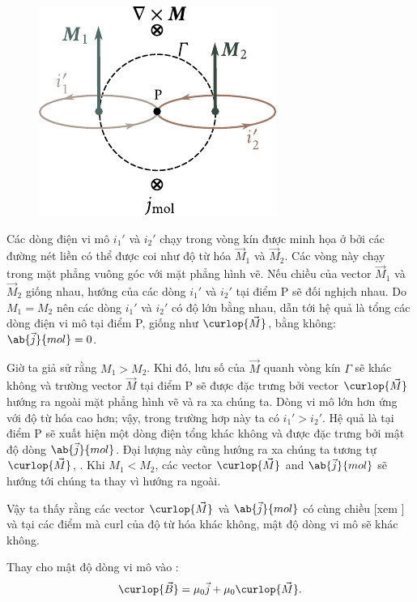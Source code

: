 \begin{figure}[!htb]
	\begin{center}
		\includegraphics[scale=1]{figures/ch_07/fig_7_3.pdf}
		\caption[]{}
		\label{fig:7_3}
	\end{center}
	\vspace{-0.8cm}
\end{figure}

Các dòng điện vi mô $i_1'$ và $i_2'$ chạy trong vòng kín được minh họa ở  bởi các đường nét liền có thể được coi như độ từ hóa $\vec{M}_1$ và $\vec{M}_2$.
Các vòng này chạy trong mặt phẳng vuông góc với mặt phẳng hình vẽ.
Nếu chiều của vector $\vec{M}_1$ và $\vec{M}_2$ giống nhau, hướng của các dòng $i_1'$ và $i_2'$ tại điểm P sẽ đối nghịch nhau.
Do $M_1=M_2$ nên các dòng $i_1'$ và $i_2'$ có độ lớn bằng nhau, dẫn tới hệ quả là tổng các dòng điện vi mô tại điểm P, giống như $\curlop{\vec{M}}$, bằng không: $\ab{\vec{j}}{mol}=0$.

Giờ ta giả sử rằng $M_1>M_2$.
Khi đó, lưu số của $\vec{M}$ quanh vòng kín $\Gamma$ sẽ khác không và trường vector $\vec{M}$ tại điểm P sẽ được đặc trưng bởi vector $\curlop{\vec{M}}$ hướng ra ngoài mặt phẳng hình vẽ và ra xa chúng ta.
Dòng vi mô lớn hơn ứng với độ từ hóa cao hơn; vậy, trong trường hơp này ta có $i_1'>i_2'$.
Hệ quả là tại điểm P sẽ xuất hiện một dòng điện tổng khác không và được đặc trưng bởi mật độ dòng $\ab{\vec{j}}{mol}$.
Đại lượng này cũng hướng ra xa chúng ta tương tự $\curlop{\vec{M}}$, .
Khi $M_1<M_2$, các vector $\curlop{\vec{M}}$ and $\ab{\vec{j}}{mol}$ sẽ hướng tới chúng ta thay vì hướng ra ngoài.

Vậy ta thấy rằng các vector $\curlop{\vec{M}}$ và $\ab{\vec{j}}{mol}$ có cùng chiều [xem ] và tại các điểm mà curl của độ từ hóa khác không, mật độ dòng vi mô sẽ khác không.

Thay  cho mật độ dòng vi mô vào :
\begin{equation*}
    \curlop{\vec{B}} = \mu_0 \vec{j} + \mu_0 \curlop{\vec{M}}.
\end{equation*}

